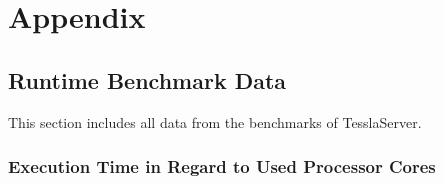 %
\chapter{Appendix}
\label{sec:appendix}

\section{Runtime Benchmark Data}
\label{sec:appendix:runtime_benchmark_data}

This section includes all data from the benchmarks of TesslaServer.

\subsection{Execution Time in Regard to Used Processor Cores}
\label{sec:appendix:runtime_benchmark_data:execution_time_cores}

